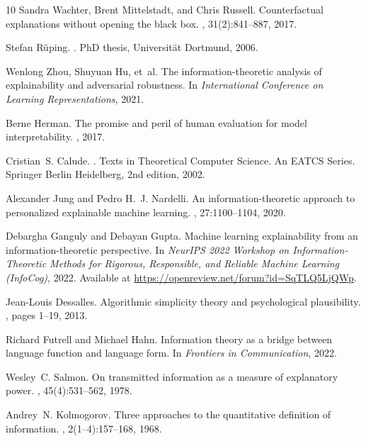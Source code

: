 \documentclass[11pt,letter,leqno]{article}
\begin{document}
\begin{thebibliography}{10}
Sandra Wachter, Brent Mittelstadt, and Chris Russell.
\newblock Counterfactual explanations without opening the black box.
, 31(2):841--887, 2017.

Stefan R{\"u}ping.
.
\newblock PhD thesis, Universit{\"a}t Dortmund, 2006.

Wenlong Zhou, Shuyuan Hu, et~al.
\newblock The information-theoretic analysis of explainability and adversarial
  robustness.
\newblock In {\em International Conference on Learning Representations}, 2021.

Berne Herman.
\newblock The promise and peril of human evaluation for model interpretability.
, 2017.

Cristian~S. Calude.
.
\newblock Texts in Theoretical Computer Science. An EATCS Series. Springer
  Berlin Heidelberg, 2nd edition, 2002.

Alexander Jung and Pedro H.~J. Nardelli.
\newblock An information-theoretic approach to personalized explainable machine
  learning.
, 27:1100--1104, 2020.

Debargha Ganguly and Debayan Gupta.
\newblock Machine learning explainability from an information-theoretic
  perspective.
\newblock In {\em NeurIPS 2022 Workshop on Information-Theoretic Methods for
  Rigorous, Responsible, and Reliable Machine Learning (InfoCog)}, 2022.
\newblock Available at \url{https://openreview.net/forum?id=SqTLQ5LjQWp}.

Jean-Louis Dessalles.
\newblock Algorithmic simplicity theory and psychological plausibility.
, pages 1--19,
  2013.

Richard Futrell and Michael Hahn.
\newblock Information theory as a bridge between language function and language
  form.
\newblock In {\em Frontiers in Communication}, 2022.

Wesley~C. Salmon.
\newblock On transmitted information as a measure of explanatory power.
, 45(4):531--562, 1978.

Andrey~N. Kolmogorov.
\newblock Three approaches to the quantitative definition of information.
,
  2(1--4):157--168, 1968.


\end{thebibliography}
\end{document}
